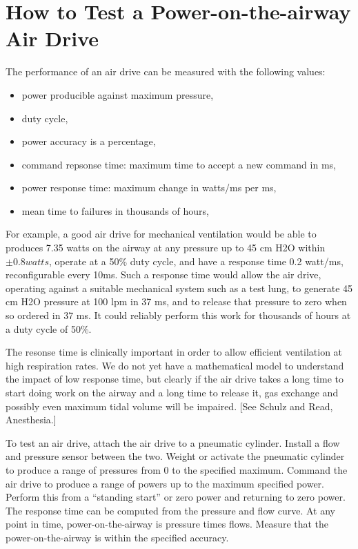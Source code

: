 \documentclass[conference]{article}
\begin{document}
\section{How to Test a  Power-on-the-airway Air Drive}

The performance of an air drive can be measured with the following values:
\begin{itemize}
\item{power producible against maximum pressure,}
\item{duty cycle,}
\item{power accuracy is a percentage,}
\item{command repsonse time: maximum time to accept a new command in ms,}
\item{power response time: maximum change in watts/ms per ms,}
\item{mean time to failures in thousands of hours,}
\end{itemize}


For example, a good air drive for mechanical ventilation would be
able to produces 7.35 watts on the airway at any pressure up to 45 cm H2O within
$\pm 0.8 watts$, operate at a
50\% duty cycle, and have a response time 0.2 watt/ms, reconfigurable every 10ms.
Such a response time
would allow the air drive, operating against a suitable mechanical system such
as a test lung, to generate 45 cm H2O pressure at 100 lpm in 37 ms, and
to release that pressure to zero when so ordered in 37 ms.
It could reliably perform this work for thousands of hours at a duty cycle of 50\%.

The resonse time is clinically important in order to allow efficient ventilation
at high respiration rates.
We do not yet have a mathematical model to understand the impact of low response time,
but clearly if the air drive takes a long time to start doing work on the airway
and a long time to release it, gas exchange and possibly even maximum tidal volume
will be impaired. [See Schulz and Read, Anesthesia.]

To test an air drive, attach the air drive to a pneumatic cylinder. Install a flow
and pressure sensor between the two. Weight or activate the pneumatic cylinder
to produce a range of pressures from 0 to the specified maximum. Command the air drive
to produce a range of powers up to the maximum specified power. Perform this
from a ``standing start'' or zero power and returning to zero power. The response time
can be computed from the pressure and flow curve. At any point in time, power-on-the-airway
is pressure times flows. Measure that the power-on-the-airway is within the specified
accuracy.
\end{document}
